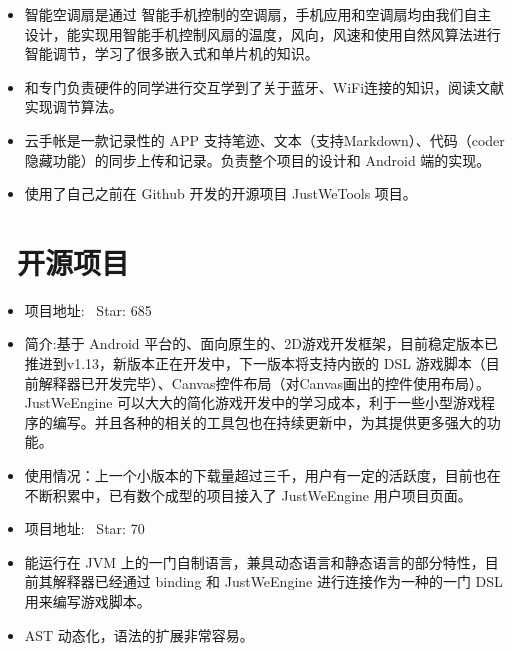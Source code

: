 \documentclass{resume}
\begin{document}

\begin{itemize}
  \item 智能空调扇是通过 智能手机控制的空调扇，手机应用和空调扇均由我们自主设计，能实现用智能手机控制风扇的温度，风向，风速和使用自然风算法进行智能调节，学习了很多嵌入式和单片机的知识。
  \item 和专门负责硬件的同学进行交互学到了关于蓝牙、WiFi连接的知识，阅读文献实现调节算法。
\end{itemize}



\begin{itemize}
  \item 云手帐是一款记录性的 APP 支持笔迹、文本（支持Markdown）、代码（coder隐藏功能）的同步上传和记录。负责整个项目的设计和 Android 端的实现。
  \item 使用了自己之前在 Github 开发的开源项目 JustWeTools 项目。
\end{itemize}

\section{\faGithubSquare\ 开源项目}
\begin{itemize}
  \item 项目地址:{} {\textperiodcentered\ Star: 685}
  \item 简介:基于 Android 平台的、面向原生的、2D游戏开发框架，目前稳定版本已推进到v1.13，新版本正在开发中，下一版本将支持内嵌的 DSL 游戏脚本（目前解释器已开发完毕）、Canvas控件布局（对Canvas画出的控件使用布局）。JustWeEngine 可以大大的简化游戏开发中的学习成本，利于一些小型游戏程序的编写。并且各种的相关的工具包也在持续更新中，为其提供更多强大的功能。
  \item 使用情况：上一个小版本的下载量超过三千，用户有一定的活跃度，目前也在不断积累中，已有数个成型的项目接入了 JustWeEngine 用户项目页面。
\end{itemize}

\begin{itemize}
  \item 项目地址:{} {\textperiodcentered\ Star: 70}
  \item 能运行在 JVM 上的一门自制语言，兼具动态语言和静态语言的部分特性，目前其解释器已经通过 binding 和 JustWeEngine 进行连接作为一种的一门 DSL 用来编写游戏脚本。
  \item AST 动态化，语法的扩展非常容易。
\end{itemize}
\end{document}
